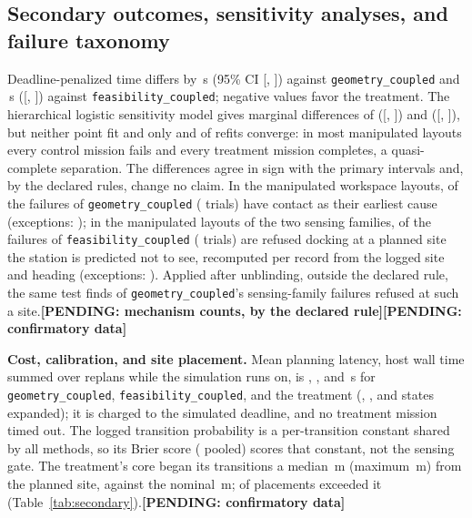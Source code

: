 \documentclass[conference]{IEEEtran}
\newcommand{\pending}[1]{\textbf{[PENDING: #1]}}
\newcommand{\method}[1]{\texttt{#1}}
\newcommand{\withresults}[2]{\ifdefined\resTrials #1\else #2\fi}
\begin{document}
\subsection{Secondary outcomes, sensitivity analyses, and failure taxonomy}
\label{sec:secondary}
\withresults{Deadline-penalized time differs by \resTimeDeltaVsGeometry\,s (95\% CI [\resTimeCILowVsGeometry, \resTimeCIHighVsGeometry]) against \method{geometry\_coupled} and \resTimeDeltaVsFeasibility\,s ([\resTimeCILowVsFeasibility, \resTimeCIHighVsFeasibility]) against \method{feasibility\_coupled}; negative values favor the treatment. The hierarchical logistic sensitivity model gives marginal differences of \resHierDeltaVsGeometry{} ([\resHierCILowVsGeometry, \resHierCIHighVsGeometry]) and \resHierDeltaVsFeasibility{} ([\resHierCILowVsFeasibility, \resHierCIHighVsFeasibility]), but neither point fit and only \resHierConvergedVsGeometry{} and \resHierConvergedVsFeasibility{} of \resHierRequestedVsGeometry{} refits converge: in most manipulated layouts every control mission fails and every treatment mission completes, a quasi-complete separation. The differences agree in sign with the primary intervals and, by the declared rules, change no claim. \ifdefined\resMechGeomCount In the manipulated workspace layouts, \resMechGeomCount{} of the \resMechGeomFailures{} failures of \method{geometry\_coupled} (\resMechGeomTrials{} trials) have contact as their earliest cause (exceptions: \resMechGeomExceptionList); in the manipulated layouts of the two sensing families, \resMechFeasCount{} of the \resMechFeasFailures{} failures of \method{feasibility\_coupled} (\resMechFeasTrials{} trials) are refused docking at a planned site the station is predicted not to see, recomputed per record from the logged site and heading (exceptions: \resMechFeasExceptionList). Applied after unblinding, outside the declared rule, the same test finds \resMechGeomSensCount{} of \method{geometry\_coupled}'s \resMechGeomSensFailures{} sensing-family failures refused at such a site.\else\pending{mechanism counts, by the declared rule}\fi}{\pending{confirmatory data}}

\withresults{\textbf{Cost, calibration, and site placement.} Mean planning latency, host wall time summed over replans while the simulation runs on, is \resLatencyGeometry, \resLatencyFeasibility, and \resLatencySensing\,s for \method{geometry\_coupled}, \method{feasibility\_coupled}, and the treatment (\resExpandedGeometry, \resExpandedFeasibility, and \resExpandedSensing{} states expanded); it is charged to the simulated deadline, and no treatment mission timed out. The logged transition probability is a per-transition constant shared by all methods, so its Brier score (\resBrier{} pooled) scores that constant, not the sensing gate. The treatment's core began its transitions a median \resPlacementMedianSensing\,m (maximum \resPlacementMaxSensing\,m) from the planned site, against the nominal \resNominalSiteTolerance\,m; \resPlacementsBeyondSensing{} of \resPlacementsSensing{} placements exceeded it (Table~\ref{tab:secondary}).}{\pending{confirmatory data}}
\end{document}
